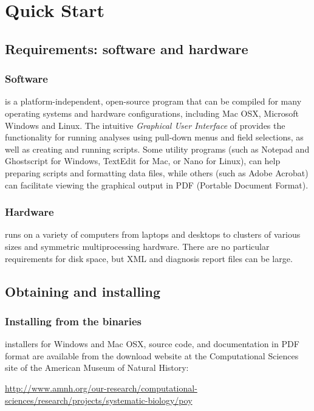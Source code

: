 \chapter{\poy Quick Start}

\section{Requirements: software and hardware}

\subsection{Software}
\poy is a platform-independent, open-source program that can be compiled for many operating systems 
and hardware configurations, including Mac OSX, Microsoft Windows and Linux. %
The intuitive \emph{Graphical User Interface} of \poy provides the functionality for running analyses using pull-down 
menus and field selections, as well as creating and running \poy scripts. Some utility programs (such as Notepad 
and Ghostscript for Windows, TextEdit for Mac, or Nano for Linux), can help preparing \poy scripts and formatting 
data files, while others (such as Adobe Acrobat) can facilitate viewing the graphical output in PDF (Portable Document Format).

\subsection{Hardware}
\poy runs on a variety of computers from laptops and desktops to clusters 
of various sizes and symmetric multiprocessing hardware. There are no
particular requirements for disk space, but XML and diagnosis report files can be large.

\section{Obtaining and installing \poy}
\subsection{Installing from the binaries}
\poy installers for Windows and Mac OSX, source code, and documentation in PDF format are available from 
the \poy download website at the Computational Sciences site of the American Museum of Natural History:

\begin{center}
\url{http://www.amnh.org/our-research/computational-sciences/research/projects/systematic-biology/poy}
\end{center}

